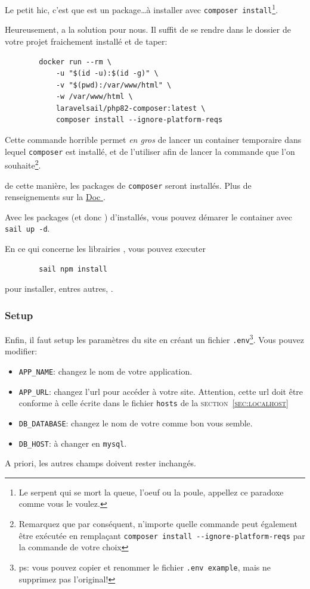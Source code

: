     Le petit hic, c'est que \laravelsail{} est un package\ldots à installer avec \verb|composer install|\footnote{Le serpent qui se mort la queue, l'oeuf ou la poule, appellez ce paradoxe comme vous le voulez.}. 

    Heureusement, \laravel{} a la solution pour nous. Il suffit de se rendre dans le dossier de votre projet fraichement installé et de taper:
    \begin{lstlisting}
        docker run --rm \
            -u "$(id -u):$(id -g)" \
            -v "$(pwd):/var/www/html" \
            -w /var/www/html \
            laravelsail/php82-composer:latest \
            composer install --ignore-platform-reqs
    \end{lstlisting}

    Cette commande horrible permet \textit{en gros} de lancer un container temporaire dans lequel \texttt{composer} est installé, et de l'utiliser afin de lancer la commande que l'on souhaite\footnote{Remarquez que par conséquent, n'importe quelle commande \php{} peut également être exécutée en remplaçant \verb|composer install --ignore-platform-reqs| par la commande de votre choix}.

    de cette manière, les packages de \texttt{composer} seront installés. Plus de renseignements sur la \href{https://laravel.com/docs/10.x/sail#installing-composer-dependencies-for-existing-projects}{Doc \laravel}.
    
    Avec les packages (et donc \laravelsail{}) d'installés, vous pouvez démarer le container avec \verb|sail up -d|.

    En ce qui concerne les librairies \js{}, vous pouvez executer 
    \begin{lstlisting}
        sail npm install
    \end{lstlisting}
    pour installer, entres autres, \vite.

    \subsubsection[Setup]{Setup}
    Enfin, il faut setup les paramètres du site en créant un fichier \verb|.env|\footnote{ps: vous pouvez copier et renommer le fichier \verb|.env example|, mais ne supprimez pas l'original!}. Vous pouvez modifier:

    \begin{itemize}
        \item \verb|APP_NAME|: changez le nom de votre application.
        \item \verb|APP_URL|: changez l'url pour accéder à votre site. Attention, cette url doit être conforme à celle écrite dans le fichier \verb|hosts| de la \textsc{section~\ref{sec:localhost}}
        \item \verb|DB_DATABASE|: changez le nom de votre \db{} comme bon vous semble.
        \item \verb|DB_HOST|: à changer en \verb|mysql|.
    \end{itemize}
    A priori, les autres champs doivent rester inchangés.

